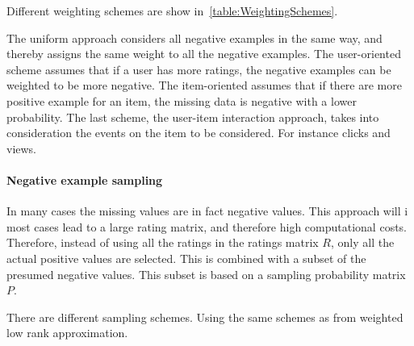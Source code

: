 Different weighting schemes are show in~\ref{table:WeightingSchemes}.

The uniform approach considers all negative examples in the same way, and
thereby assigns the same weight to all the negative examples.  The
user-oriented scheme assumes that if a user has more ratings, the negative
examples can be weighted to be more negative.  The item-oriented assumes that
if there are more positive example for an item, the missing data is negative
with a lower probability.  The last scheme, the user-item interaction
approach, takes into consideration the events on the item to be considered.
For instance clicks and views.

\paragraph{Negative example sampling~\cite{pan2008}}

In many cases the missing values are in fact negative values.  This approach
will i most cases lead to a large rating matrix, and therefore high
computational costs.  Therefore, instead of using all the ratings in the
ratings matrix $R$, only all the actual positive values are selected.  This is
combined with a subset of the presumed negative values.  This subset is based
on a sampling probability matrix $P$.

There are different sampling schemes.
Using the same schemes as from weighted low rank approximation.



